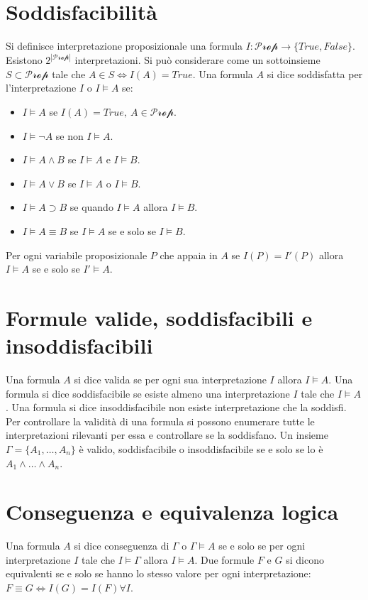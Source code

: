 \section{Soddisfacibilit\`a}
Si definisce interpretazione proposizionale una formula $I:\mathcal{Prop}\rightarrow\{True, False\}$. Esistono $2^{|\mathcal{Prop}|}$ interpretazioni. Si 
pu\`o considerare come un sottoinsieme $S\subset\mathcal{Prop}$ tale che $A\in S\Leftrightarrow I(A)=True$. Una formula $A$ si dice soddisfatta per 
l'interpretazione $I$ o $I\models A$ se:
\begin{itemize}
\item $I\models A$ se $I(A)=True,\ A\in\mathcal{Prop}$.
\item $I\models\neg A$ se non $I\models A$.
\item $I\models A\land B$ se $I\models A$ e $I\models B$.
\item $I\models A\lor B$ se $I\models A$ o $I\models B$.
\item $I\models A\supset B$ se quando $I\models A$ allora $I\models B$.
\item $I\models A\equiv B$ se $I\models A$ se e solo se $I\models B$.
\end{itemize} 
Per ogni variabile proposizionale $P$ che appaia in $A$ se $I(P)=I'(P)$ allora $I\models A$ se e solo se $I'\models A$. 
\section{Formule valide, soddisfacibili e insoddisfacibili}
Una formula $A$ si dice valida se per ogni sua interpretazione $I$ allora $I\models A$. Una formula si dice soddisfacibile se esiste almeno una 
interpretazione $I$ tale che $I\models A$. Una formula si dice insoddisfacibile non esiste interpretazione che la soddisfi. Per controllare la validit\`a
di una formula si possono enumerare tutte le interpretazioni rilevanti per essa e controllare se la soddisfano. Un insieme $\Gamma=\{A_1, \dots, A_n\}$ \`e
valido, soddisfacibile o insoddisfacibile se e solo se lo \`e $A_1\land\dots\land A_n$. 
\section{Conseguenza e equivalenza logica}
Una formula $A$ si dice conseguenza di $\Gamma$ o $\Gamma\models A$ se e solo se per ogni interpretazione $I$ tale che $I\models\Gamma$ allora $I\models A$. 
Due formule $F$ e $G$ si dicono equivalenti se e solo se hanno lo stesso valore per ogni interpretazione: $F\equiv G\Leftrightarrow I(G)=I(F)\forall I$.
